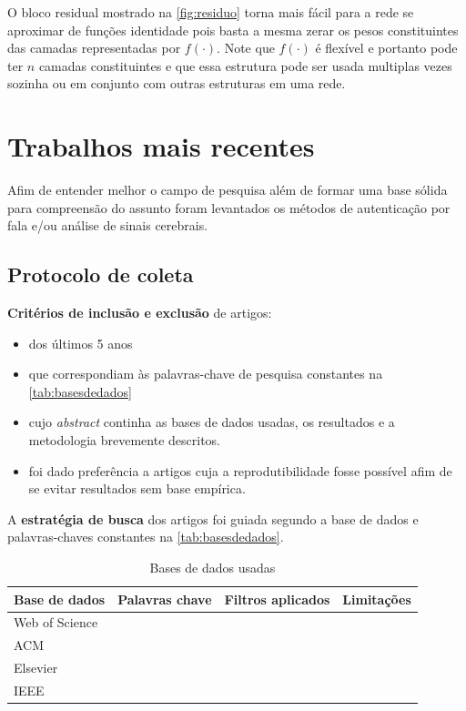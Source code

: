 				\par O bloco residual mostrado na \autoref{fig:residuo} torna mais fácil para a rede se aproximar de funções identidade pois basta a mesma zerar os pesos constituintes das camadas representadas por $f(\cdot)$. Note que $f(\cdot)$ é flexível e portanto pode ter $n$ camadas constituintes e que essa estrutura pode ser usada multiplas vezes sozinha ou em conjunto com outras estruturas em uma rede.

	\section{Trabalhos mais recentes}
	
		\par Afim de entender melhor o campo de pesquisa além de formar uma base sólida para compreensão do assunto foram levantados os métodos de autenticação por fala e/ou análise de sinais cerebrais.
		
		\subsection{Protocolo de coleta}
		
			\par \textbf{Critérios de inclusão e exclusão} de artigos:
			\begin{itemize}
				\item dos últimos 5 anos
				\item que correspondiam às palavras-chave de pesquisa constantes na \autoref{tab:basesdedados}
				\item cujo \textit{abstract} continha as bases de dados usadas, os resultados e a metodologia brevemente descritos.
				\item foi dado preferência a artigos cuja a reprodutibilidade fosse possível afim de se evitar resultados sem base empírica.
			\end{itemize}
			
			
			\par A \textbf{estratégia de busca} dos artigos foi guiada segundo a base de dados e palavras-chaves constantes na \autoref{tab:basesdedados}.
			\begin{table}[H]
				\begin{center}
					\caption[Bases de dados usadas]{Bases de dados usadas}
					\begin{tabular}{|l|l|l|l|}
						\hline
						Base de dados & Palavras chave & Filtros aplicados & Limitações \\
						\hline
						Web of Science & & & \\
						\hline
						ACM & & & \\
						\hline
						Elsevier & & & \\
						\hline
						IEEE & & & \\
						\hline
					\end{tabular}
					\label{tab:basesdedados}
				\end{center}
			\end{table}
		
